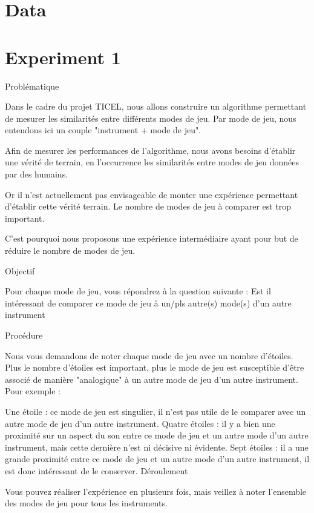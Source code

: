 \documentclass{article}
\begin{document}
\section{Data}\label{sec:}

\section{Experiment 1}\label{sec:}

Problématique

Dans le cadre du projet TICEL, nous allons construire un algorithme permettant de mesurer les similarités entre différents modes de jeu. Par mode de jeu, nous entendons ici un couple "instrument + mode de jeu".

Afin de mesurer les performances de l'algorithme, nous avons besoins d'établir une vérité de terrain, en l’occurrence les similarités entre modes de jeu données par des humains.

Or il n'est actuellement pas envisageable de monter une expérience permettant d'établir cette vérité terrain. Le nombre de modes de jeu à comparer est trop important.

C'est pourquoi nous proposons une expérience intermédiaire ayant pour but de réduire le nombre de modes de jeu.

Objectif

Pour chaque mode de jeu, vous répondrez à la question suivante : Est il intéressant de comparer ce mode de jeu à un/pls autre(s) mode(s) d'un autre instrument

Procédure

Nous vous demandons de noter chaque mode de jeu avec un nombre d’étoiles. Plus le nombre d'étoiles est important, plus le mode de jeu est susceptible d'être associé de manière "analogique" à un autre mode de jeu d'un autre instrument. Pour exemple :

Une étoile : ce mode de jeu est singulier, il n’est pas utile de le comparer avec un autre mode de jeu d'un autre instrument.
Quatre étoiles : il y a bien une proximité sur un aspect du son entre ce mode de jeu et un autre mode d'un autre instrument, mais cette dernière n'est ni décisive ni évidente.
Sept étoiles : il a une grande proximité entre ce mode de jeu et un autre mode d'un autre instrument, il est donc intéressant de le conserver.
Déroulement

Vous pouvez réaliser l'expérience en plusieurs fois, mais veillez à noter l'ensemble des modes de jeu pour tous les instruments.
\end{document}

